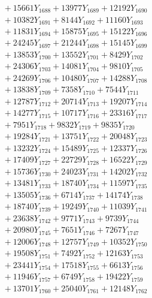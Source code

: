 \documentclass[a4paper,10pt]{article}
\begin{document}
{\begin{align}
&\;  + 15661 Y_{1688} + 13977 Y_{1689} + 12192 Y_{1690} \\[0.3ex]
&\;  + 10382 Y_{1691} + 8144 Y_{1692} + 11160 Y_{1693} \\[0.3ex]
&\;  + 11831 Y_{1694} + 15875 Y_{1695} + 15122 Y_{1696} \\[0.3ex]
&\;  + 24245 Y_{1697} + 21244 Y_{1698} + 15145 Y_{1699} \\[0.3ex]
&\;  + 13853 Y_{1700} + 13552 Y_{1701} + 8429 Y_{1702} \\[0.3ex]
&\;  + 24306 Y_{1703} + 14081 Y_{1704} + 9810 Y_{1705} \\[0.3ex]
&\;  + 24269 Y_{1706} + 10480 Y_{1707} + 14288 Y_{1708} \\[0.5ex]\allowbreak
&\;  + 13838 Y_{1709} + 7358 Y_{1710} + 7544 Y_{1711} \\[0.3ex]
&\;  + 12787 Y_{1712} + 20714 Y_{1713} + 19207 Y_{1714} \\[0.3ex]
&\;  + 14277 Y_{1715} + 10717 Y_{1716} + 23316 Y_{1717} \\[0.3ex]
&\;  + 7951 Y_{1718} + 9832 Y_{1719} + 9835 Y_{1720} \\[0.3ex]
&\;  + 19284 Y_{1721} + 13751 Y_{1722} + 20048 Y_{1723} \\[0.3ex]
&\;  + 13232 Y_{1724} + 15489 Y_{1725} + 12337 Y_{1726} \\[0.3ex]
&\;  + 17409 Y_{1727} + 22729 Y_{1728} + 16522 Y_{1729} \\[0.3ex]
&\;  + 15736 Y_{1730} + 24023 Y_{1731} + 14202 Y_{1732} \\[0.3ex]
&\;  + 13481 Y_{1733} + 18740 Y_{1734} + 11597 Y_{1735} \\[0.3ex]
&\;  + 13505 Y_{1736} + 6714 Y_{1737} + 14174 Y_{1738} \\[0.5ex]\allowbreak
&\;  + 18740 Y_{1739} + 19249 Y_{1740} + 11039 Y_{1741} \\[0.3ex]
&\;  + 23638 Y_{1742} + 9771 Y_{1743} + 9739 Y_{1744} \\[0.3ex]
&\;  + 20980 Y_{1745} + 7651 Y_{1746} + 7267 Y_{1747} \\[0.3ex]
&\;  + 12006 Y_{1748} + 12757 Y_{1749} + 10352 Y_{1750} \\[0.3ex]
&\;  + 19508 Y_{1751} + 7492 Y_{1752} + 12163 Y_{1753} \\[0.3ex]
&\;  + 23441 Y_{1754} + 17518 Y_{1755} + 6613 Y_{1756} \\[0.3ex]
&\;  + 11946 Y_{1757} + 6749 Y_{1758} + 19422 Y_{1759} \\[0.3ex]
&\;  + 13701 Y_{1760} + 25040 Y_{1761} + 12148 Y_{1762} \\[0.3ex]

\end{align}}
\end{document}
